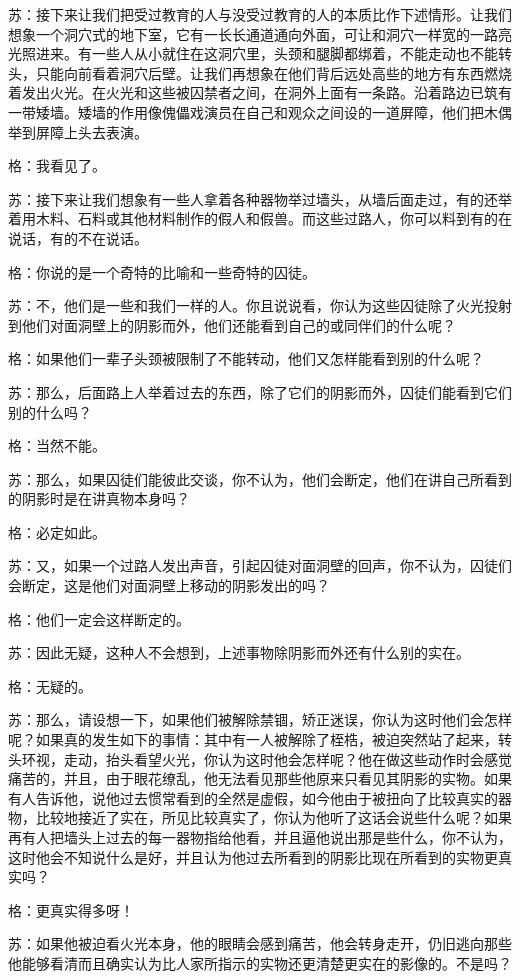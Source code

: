 \documentclass[12pt,oneside]{book}
\begin{document}
苏：接下来让我们把受过教育的人与没受过教育的人的本质比作下述情形。让我们想象一个洞穴式的地下室，它有一长长通道通向外面，可让和洞穴一样宽的一路亮光照进来。有一些人从小就住在这洞穴里，头颈和腿脚都绑着，不能走动也不能转头，只能向前看着洞穴后壁。让我们再想象在他们背后远处高些的地方有东西燃烧着发出火光。在火光和这些被囚禁者之间，在洞外上面有一条路。沿着路边已筑有一带矮墙。矮墙的作用像傀儡戏演员在自己和观众之间设的一道屏障，他们把木偶举到屏障上头去表演。

格：我看见了。

苏：接下来让我们想象有一些人拿着各种器物举过墙头，从墙后面走过，有的还举着用木料、石料或其他材料制作的假人和假兽。而这些过路人，你可以料到有的在说话，有的不在说话。

格：你说的是一个奇特的比喻和一些奇特的囚徒。

苏：不，他们是一些和我们一样的人。你且说说看，你认为这些囚徒除了火光投射到他们对面洞壁上的阴影而外，他们还能看到自己的或同伴们的什么呢？

格：如果他们一辈子头颈被限制了不能转动，他们又怎样能看到别的什么呢？

苏：那么，后面路上人举着过去的东西，除了它们的阴影而外，囚徒们能看到它们别的什么吗？

格：当然不能。

苏：那么，如果囚徒们能彼此交谈，你不认为，他们会断定，他们在讲自己所看到的阴影时是在讲真物本身吗？

格：必定如此。

苏：又，如果一个过路人发出声音，引起囚徒对面洞壁的回声，你不认为，囚徒们会断定，这是他们对面洞壁上移动的阴影发出的吗？

格：他们一定会这样断定的。

苏：因此无疑，这种人不会想到，上述事物除阴影而外还有什么别的实在。

格：无疑的。

苏：那么，请设想一下，如果他们被解除禁锢，矫正迷误，你认为这时他们会怎样呢？如果真的发生如下的事情：其中有一人被解除了桎梏，被迫突然站了起来，转头环视，走动，抬头看望火光，你认为这时他会怎样呢？他在做这些动作时会感觉痛苦的，并且，由于眼花缭乱，他无法看见那些他原来只看见其阴影的实物。如果有人告诉他，说他过去惯常看到的全然是虚假，如今他由于被扭向了比较真实的器物，比较地接近了实在，所见比较真实了，你认为他听了这话会说些什么呢？如果再有人把墙头上过去的每一器物指给他看，并且逼他说出那是些什么，你不认为，这时他会不知说什么是好，并且认为他过去所看到的阴影比现在所看到的实物更真实吗？

格：更真实得多呀！

苏：如果他被迫看火光本身，他的眼睛会感到痛苦，他会转身走开，仍旧逃向那些他能够看清而且确实认为比人家所指示的实物还更清楚更实在的影像的。不是吗？
\end{document}
